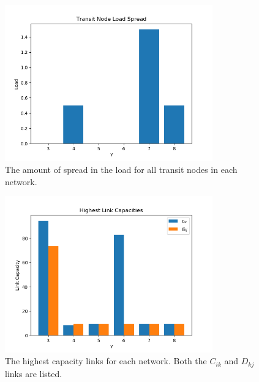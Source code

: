 \documentclass[12pt]{article} %
\begin{document}
\begin{figure}[H]
	\centering
	\includegraphics[width=0.8\textwidth]{cplex_data_transit_load_spread}
	\caption{The amount of spread in the load for all transit nodes in each network.}
	\label{fig:cplex_transit_load_spread}
\end{figure}

\begin{figure}[H]
	\centering
	\includegraphics[width=0.8\textwidth]{cplex_data_highest_capacity_links}
	\caption{The highest capacity links for each network. Both the $C_{ik}$ and $D_{kj}$ links are listed.}
	\label{fig:cplex_highest_capacity_links}
\end{figure}

\end{document}
